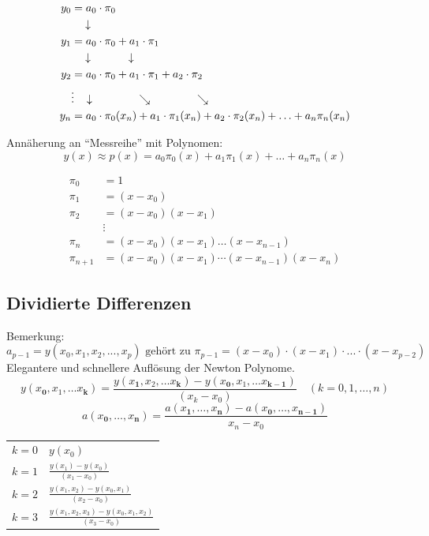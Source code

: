 \begin{minipage}[t]{7.5cm}
	\begin{align}
		y_0 &= a_0\cdot \pi_0 \nonumber\\
		&\quad \downarrow\nonumber\\
		y_1 &= a_0\cdot \pi_0 +a_1\cdot\pi_1 \nonumber\\
		&\quad \downarrow \hspace{1.2cm}\downarrow\nonumber\\
		y_2 &= a_0\cdot \pi_0 +a_1\cdot\pi_1  +a_2\cdot\pi_2  \nonumber\\
		&\vdots\hspace{0.3cm}\downarrow \hspace{1.5cm}\searrow\hspace{1.5cm}\searrow\nonumber\\
		y_n &= a_0\cdot \pi_0(x_n) +a_1\cdot\pi_1(x_n)  +a_2\cdot\pi_2(x_n)+\ldots+ a_n\pi_n(x_n) \nonumber
	\end{align}

	Annäherung an ``Messreihe'' mit Polynomen: $$y(x)\approx p(x) = a_0 \pi_0(x) + a_1 \pi_1(x) + \ldots+ a_{n} \pi_{n}(x)$$
\end{minipage}
\hfill
\begin{minipage}[t]{11.5cm}
	\begin{align}
		\pi_0 &= 1 \nonumber\\
		\pi_1 &= (x-x_0) \nonumber\\
		\pi_2 &= (x-x_0)(x-x_1) \nonumber\\
		&\vdots \nonumber\\
		\pi_n &= (x-x_0)(x-x_1)\ldots(x-x_{n-1}) \nonumber\\
		\pi_{n+1} &= (x-x_0)(x-x_1)\cdots(x-x_{n-1})(x-x_n) \nonumber
	\end{align}	
\end{minipage}

\subsection{Dividierte Differenzen}
Bemerkung:
\[
	a_{p-1} = y(x_0,x_1,x_2, ... , x_p) \text{ gehört zu } \pi_{p-1}=(x-x_0)\cdot(x-x_1)\cdot ... \cdot (x-x_{p-2})
\]
Elegantere und schnellere Auflösung der Newton Polynome.
$$y(x_\mathbf{0}, x_1, \ldots x_\mathbf{k}) = \frac{y(x_\mathbf{1},x_2,\ldots x_\mathbf{k})-y(x_\mathbf{0},x_1,\ldots x_{\mathbf{k-1}})}{(x_k-x_0)} \quad (k=0,1,\ldots,n)$$
$$a(x_\mathbf{0},\ldots,x_\mathbf{n})=\frac{a(x_\mathbf{1},\ldots,x_\mathbf{n})-a(x_\mathbf{0},\ldots,x_{\mathbf{n-1}})}{x_n-x_0}$$
\begin{tabular}{ll}
$k=0$ &$y(x_0)$ \\[0.2cm]
$k=1$ &$\frac{y(x_1)-y(x_0)}{(x_1-x_0)}$\\[0.2cm]
$k=2$ &$\frac{y(x_1,x_2)-y(x_0,x_1)}{(x_2-x_0)}$\\[0.2cm]
$k=3$ &$\frac{y(x_1,x_2,x_3)-y(x_0,x_1,x_2)}{(x_3-x_0)}$\\
\end{tabular}\\
\\

